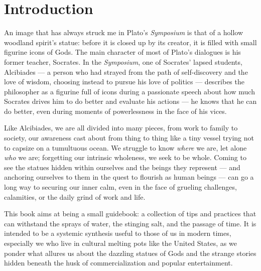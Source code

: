 \documentclass[
]{book}
\begin{document}
\hypertarget{intro}{%
\chapter{Introduction}\label{intro}}

An image that has always struck me in Plato's \emph{Symposium} is that of a hollow woodland spirit's statue: before it is closed up by its creator, it is filled with small figurine icons of Gods. The main character of most of Plato's dialogues is his former teacher, Socrates. In the \emph{Symposium}, one of Socrates' lapsed students, Alcibiades --- a person who had strayed from the path of self-discovery and the love of wisdom, choosing instead to pursue his love of politics --- describes the philosopher as a figurine full of icons during a passionate speech about how much Socrates drives him to do better and evaluate his actions --- he knows that he can do better, even during moments of powerlessness in the face of his vices.

Like Alcibiades, we are all divided into many pieces, from work to family to society, our awareness cast about from thing to thing like a tiny vessel trying not to capsize on a tumultuous ocean. We struggle to know \emph{where} we are, let alone \emph{who} we are; forgetting our intrinsic wholeness, we seek to be whole. Coming to see the statues hidden within ourselves and the beings they represent --- and anchoring ourselves to them in the quest to flourish as human beings --- can go a long way to securing our inner calm, even in the face of grueling challenges, calamities, or the daily grind of work and life.

This book aims at being a small guidebook: a collection of tips and practices that can withstand the sprays of water, the stinging salt, and the passage of time. It is intended to be a systemic synthesis useful to those of us in modern times, especially we who live in cultural melting pots like the United States, as we ponder what allures us about the dazzling statues of Gods and the strange stories hidden beneath the husk of commercialization and popular entertainment.
\end{document}
